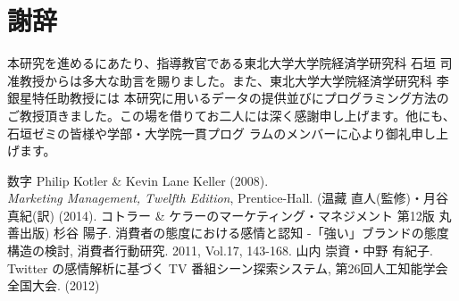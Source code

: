 \documentclass[uplatex,11pt]{jsarticle}
\begin{document}
\section*{謝辞}
本研究を進めるにあたり、指導教官である東北大学大学院経済学研究科 石垣 司准教授からは多大な助言を賜りました。また、東北大学大学院経済学研究科 李 銀星特任助教授には
本研究に用いるデータの提供並びにプログラミング方法のご教授頂きました。この場を借りてお二人には深く感謝申し上げます。他にも、石垣ゼミの皆様や学部・大学院一貫プログ
ラムのメンバーに心より御礼申し上げます。
\begin{thebibliography}{数字}
     Philip Kotler \& Kevin Lane Keller (2008). \\
        \textit{Marketing Management, Twelfth Edition}, Prentice-Hall. (温藏 直人(監修)・月谷 真紀(訳) (2014). コトラー \& ケラーのマーケティング・マネジメント 第12版 丸善出版)
     杉谷 陽子. 消費者の態度における感情と認知 -「強い」ブランドの態度構造の検討, 消費者行動研究. 2011, Vol.17, 143-168.
     山内 崇資・中野 有紀子. Twitter の感情解析に基づく TV 番組シーン探索システム, 第26回人工知能学会全国大会. (2012)
\end{thebibliography}
\end{document}
